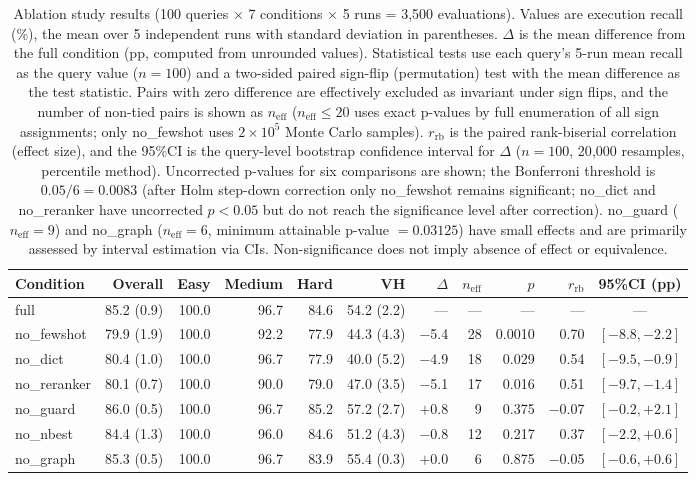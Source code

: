 \begin{table}[t]
\centering
\caption{Ablation study results (100 queries $\times$ 7 conditions $\times$ 5 runs = 3{,}500 evaluations). Values are execution recall (\%), the mean over 5 independent runs with standard deviation in parentheses. $\Delta$ is the mean difference from the full condition (pp, computed from unrounded values). Statistical tests use each query's 5-run mean recall as the query value ($n=100$) and a two-sided paired sign-flip (permutation) test with the mean difference as the test statistic. Pairs with zero difference are effectively excluded as invariant under sign flips, and the number of non-tied pairs is shown as $n_\mathrm{eff}$ ($n_\mathrm{eff}\leq20$ uses exact p-values by full enumeration of all sign assignments; only no\_fewshot uses $2\times10^5$ Monte Carlo samples). $r_\mathrm{rb}$ is the paired rank-biserial correlation (effect size), and the 95\%CI is the query-level bootstrap confidence interval for $\Delta$ ($n=100$, 20{,}000 resamples, percentile method). Uncorrected p-values for six comparisons are shown; the Bonferroni threshold is $0.05/6=0.0083$ (after Holm step-down correction only no\_fewshot remains significant; no\_dict and no\_reranker have uncorrected $p<0.05$ but do not reach the significance level after correction). no\_guard ($n_\mathrm{eff}=9$) and no\_graph ($n_\mathrm{eff}=6$, minimum attainable p-value $=0.03125$) have small effects and are primarily assessed by interval estimation via CIs. Non-significance does not imply absence of effect or equivalence.}
\label{tab:ablation}
\footnotesize
\setlength{\tabcolsep}{3.5pt}
\begin{tabular}{@{}lrrrrrrrrrc@{}}
\toprule
Condition & Overall & Easy & Medium & Hard & VH & $\Delta$ & $n_\mathrm{eff}$ & $p$ & $r_\mathrm{rb}$ & 95\%CI (pp) \\
\midrule
full          & 85.2 (0.9) & 100.0 & 96.7 & 84.6 & 54.2 (2.2) & ---    & --- & --- & --- & --- \\
no\_fewshot   & 79.9 (1.9) & 100.0 & 92.2 & 77.9 & 44.3 (4.3) & $-$5.4  & 28 & 0.0010 & 0.70 & $[-8.8, -2.2]$ \\
no\_dict      & 80.4 (1.0) & 100.0 & 96.7 & 77.9 & 40.0 (5.2) & $-$4.9  & 18 & 0.029 & 0.54 & $[-9.5, -0.9]$ \\
no\_reranker  & 80.1 (0.7) & 100.0 & 90.0 & 79.0 & 47.0 (3.5) & $-$5.1  & 17 & 0.016 & 0.51 & $[-9.7, -1.4]$ \\
no\_guard     & 86.0 (0.5) & 100.0 & 96.7 & 85.2 & 57.2 (2.7) & $+$0.8  & 9 & 0.375 & $-$0.07 & $[-0.2, +2.1]$ \\
no\_nbest     & 84.4 (1.3) & 100.0 & 96.0 & 84.6 & 51.2 (4.3) & $-$0.8  & 12 & 0.217 & 0.37 & $[-2.2, +0.6]$ \\
no\_graph     & 85.3 (0.5) & 100.0 & 96.7 & 83.9 & 55.4 (0.3) & $+$0.0  & 6 & 0.875 & $-$0.05 & $[-0.6, +0.6]$ \\
\bottomrule
\end{tabular}
\end{table}

